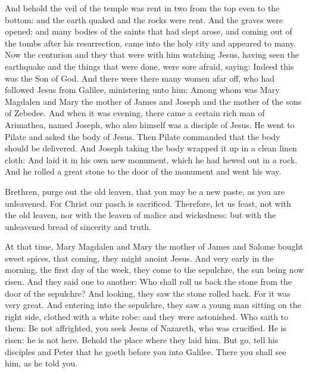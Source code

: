 And behold the veil of the temple was rent in two from the top even to the
bottom: and the earth quaked and the rocks were rent.  And the graves were
opened: and many bodies of the saints that had slept arose, and coming out of
the tombs after his resurrection, came into the holy city and appeared to many.
Now the centurion and they that were with him watching Jesus, having seen the
earthquake and the things that were done, were sore afraid, saying: Indeed this
was the Son of God.  And there were there many women afar off, who had followed
Jesus from Galilee, ministering unto him: Among whom was Mary Magdalen and Mary
the mother of James and Joseph and the mother of the sons of Zebedee.  And when
it was evening, there came a certain rich man of Arimathea, named Joseph, who
also himself was a disciple of Jesus.  He went to Pilate and asked the body of
Jesus. Then Pilate commanded that the body should be delivered.  And Joseph
taking the body wrapped it up in a clean linen cloth: And laid it in his own
new monument, which he had hewed out in a rock. And he rolled a great stone to
the door of the monument and went his way.





Brethren, purge out the old leaven, that you may be a new paste, as you are unleavened.
For Christ our pasch is sacrificed.  Therefore, let us feast, not with the old
leaven, nor with the leaven of malice and wickedness: but with the unleavened
bread of sincerity and truth.



At that time, %
Mary Magdalen and Mary the mother of James and
Salome bought sweet spices, that coming, they might anoint Jesus.  And very
early in the morning, the first day of the week, they come to the sepulchre,
the sun being now risen.   And they
said one to another: Who shall roll us back the stone from the door of the
sepulchre?  And looking, they saw the stone rolled back. For it was very great.
And entering into the sepulchre, they saw a young man sitting on the right
side, clothed with a white robe: and they were astonished.  Who saith to them:
Be not affrighted, you seek Jesus of Nazareth, who was crucified. He is risen:
he is not here.  Behold the place where they laid him.  But go, tell his
disciples and Peter that he goeth before you into Galilee. There you shall see
him, as he told you.


